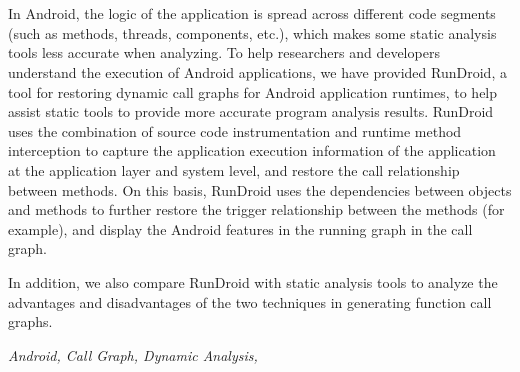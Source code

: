 \newpage
\vspace{-5.5cm}
\chapter*{}
\vspace{-0.5cm}

In Android, the logic of the application is spread across different code segments (such as methods, threads, components, etc.), which makes some static analysis tools less accurate when analyzing.
To help researchers and developers understand the execution of Android applications, we have provided RunDroid, a tool for restoring dynamic call graphs for Android application runtimes, to help assist static tools to provide more accurate program analysis results.
RunDroid uses the combination of source code instrumentation and runtime method interception to capture the application execution information of the application at the application layer and system level, and restore the call relationship between methods.
On this basis, RunDroid uses the dependencies between objects and methods to further restore the trigger relationship between the methods (for example), and display the Android features in the running graph in the call graph.

In addition, we also compare RunDroid with static analysis tools to analyze the advantages and disadvantages of the two techniques in generating function call graphs.



{} \textit{Android, Call Graph, Dynamic Analysis, }


































